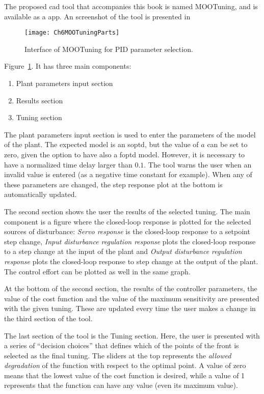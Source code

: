 The proposed \gls{cad} tool that accompanies this book is named MOOTuning, and is available as a \matlab{} app. An screenshot of the tool is presented in 
\begin{figure}[tb]
	\centering
	\texttt{[image: Ch6MOOTuningParts]}
	\caption{Interface of MOOTuning for PID parameter selection.}
	\label{fig:Ch6MOOTuningParts}
\end{figure}
Figure~\ref{fig:Ch6MOOTuningParts}. It has three main components:
\begin{enumerate}
	\item Plant parameters input section
	\item Results section
	\item Tuning section
\end{enumerate}
%
The plant parameters input section is used to enter the parameters of the model of the plant. The expected model is an \gls{soptd}, but the value of $a$ can be set to zero, given the option to have also a \gls{foptd} model. However, it is necessary to have a normalized time delay larger than $0.1$. The tool warns the user when an invalid value is entered (as a negative time constant for example). When any of these parameters are changed, the step response plot at the bottom is automatically updated.

The second section shows the user the results of the selected tuning. The main component is a figure where the closed-loop response is plotted for the selected sources of disturbance: \textit{Servo response} is the closed-loop response to a setpoint step change, \textit{Input disturbance regulation response} plots the closed-loop response to a step change at the input of the plant and \textit{Output disturbance regulation response} plots the closed-loop response to  step change at the output of the plant. The control effort can be plotted as well in the same graph.

At the bottom of the second section, the results of the controller parameters, the value of the cost function and the value of the maximum sensitivity are presented with the given tuning. These are updated every time the user makes a change in the third section of the tool.

The last section of the tool is the Tuning section. Here, the user is presented with a series of ``decision choices'' that defines which of the points of the front is selected as the final tuning. The sliders at the top represents the \textit{allowed degradation} of the function with respect to the optimal point. A value of zero means that the lowest value of the cost function is desired, while a value of 1 represents that the function can have any value (even its maximum value).

